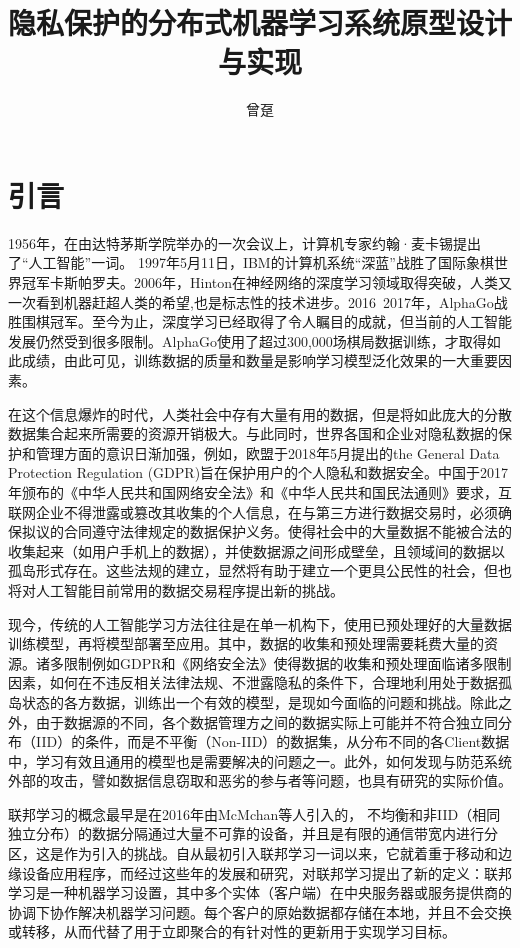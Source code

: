 \documentclass[zihao = -4,cn]{oucart}
\title{隐私保护的分布式机器学习系统原型设计与实现}
\author{曾趸}
\begin{document}
\makecover

\makesignature

\makeabstract

\thispagestyle{tableofcontents}  
\tableofcontents

\newpage
{}
\setcounter{page}{1} 
\section{引言}
1956年，在由达特茅斯学院举办的一次会议上，计算机专家约翰·麦卡锡提出了“人工智能”一词。 1997年5月11日，IBM的计算机系统“深蓝”战胜了国际象棋世界冠军卡斯帕罗夫。2006年，Hinton在神经网络的深度学习领域取得突破\cite{hinton2006fast}，人类又一次看到机器赶超人类的希望,也是标志性的技术进步。2016~2017年，AlphaGo战胜围棋冠军。至今为止，深度学习已经取得了令人瞩目的成就，但当前的人工智能发展仍然受到很多限制。AlphaGo使用了超过300,000场棋局数据训练，才取得如此成绩，由此可见，训练数据的质量和数量是影响学习模型泛化效果的一大重要因素。\par
在这个信息爆炸的时代，人类社会中存有大量有用的数据，但是将如此庞大的分散数据集合起来所需要的资源开销极大。与此同时，世界各国和企业对隐私数据的保护和管理方面的意识日渐加强，例如，欧盟于2018年5月提出的the General Data Protection Regulation (GDPR)\cite{voigt2017eu}旨在保护用户的个人隐私和数据安全。中国于2017年颁布的《中华人民共和国网络安全法》和《中华人民共和国民法通则》要求，互联网企业不得泄露或篡改其收集的个人信息，在与第三方进行数据交易时，必须确保拟议的合同遵守法律规定的数据保护义务。使得社会中的大量数据不能被合法的收集起来（如用户手机上的数据），并使数据源之间形成壁垒，且领域间的数据以孤岛形式存在。这些法规的建立，显然将有助于建立一个更具公民性的社会，但也将对人工智能目前常用的数据交易程序提出新的挑战。\par
现今，传统的人工智能学习方法往往是在单一机构下，使用已预处理好的大量数据训练模型，再将模型部署至应用。其中，数据的收集和预处理需要耗费大量的资源。诸多限制例如GDPR和《网络安全法》使得数据的收集和预处理面临诸多限制因素，如何在不违反相关法律法规、不泄露隐私的条件下，合理地利用处于数据孤岛状态的各方数据，训练出一个有效的模型，是现如今面临的问题和挑战。除此之外，由于数据源的不同，各个数据管理方之间的数据实际上可能并不符合独立同分布（IID）的条件，而是不平衡（Non-IID）的数据集，从分布不同的各Client数据中，学习有效且通用的模型也是需要解决的问题之一。此外，如何发现与防范系统外部的攻击，譬如数据信息窃取和恶劣的参与者等问题，也具有研究的实际价值。\par
联邦学习的概念最早是在2016年由McMchan等人引入的\cite{mcmahan2016communication}， 不均衡和非IID（相同独立分布）的数据分隔通过大量不可靠的设备，并且是有限的通信带宽内进行分区，这是作为引入的挑战。自从最初引入联邦学习一词以来，它就着重于移动和边缘设备应用程序\cite{mcmahan2016communication}\cite{googleaiblog}，而经过这些年的发展和研究，对联邦学习提出了新的定义：联邦学习是一种机器学习设置，其中多个实体（客户端）在中央服务器或服务提供商的协调下协作解决机器学习问题。每个客户的原始数据都存储在本地，并且不会交换或转移，从而代替了用于立即聚合的有针对性的更新用于实现学习目标。\par
\end{document}
